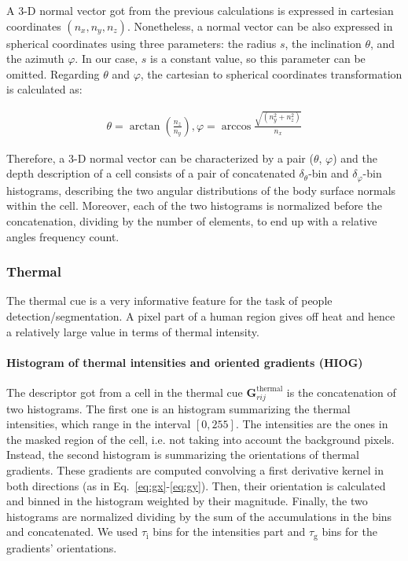 \documentclass[10pt,twocolumn,letterpaper]{article}
\begin{document}
A 3-D normal vector got from the previous calculations is expressed in cartesian coordinates $(n_x, n_y, n_z)$. Nonetheless, a normal vector can be also expressed in spherical coordinates using three parameters: the radius $s$, the inclination $\theta$, and the azimuth $\varphi$. In our case, $s$ is a constant value, so this parameter can be omitted. Regarding $\theta$ and $\varphi$, the cartesian to spherical coordinates transformation is calculated as:

\begin{gather}	
	\theta  = \arctan{\left( \frac{n_z}{n_y} \right)},
	\varphi = \arccos{\frac{ \sqrt{(n_y^2 + n_z^2)} }{n_x}}
\end{gather}

Therefore, a 3-D normal vector can be characterized by a pair ($\theta$, $\varphi$) and the depth description of a cell consists of a pair of concatenated $\delta_\theta$-bin and $\delta_\varphi$-bin histograms, describing the two angular distributions of the body surface normals within the cell. Moreover, each of the two histograms is normalized before the concatenation, dividing by the number of elements, to end up with a relative angles frequency count.

\subsubsection{Thermal}
\label{sssec:thermal}

The thermal cue is a very informative feature for the task of people detection/segmentation. A pixel part of a human region gives off heat and hence a relatively large value in terms of thermal intensity.

\paragraph{Histogram of thermal intensities and oriented gradients (HIOG)} 
The descriptor got from a cell in the thermal cue $\mathbf{G}_{rij}^{\mathrm{thermal}}$ is the concatenation of two histograms. The first one is an histogram summarizing the thermal intensities, which range in the interval $[0, 255]$. The intensities are the ones in the masked region of the cell, i.e. not taking into account the background pixels. Instead, the second histogram is summarizing the orientations of thermal gradients. These gradients are computed convolving a first derivative kernel in both directions (as in Eq.~\ref{eq:gx}-\ref{eq:gy}). Then, their orientation is calculated and binned in the histogram weighted by their magnitude. Finally, the two histograms are normalized dividing by the sum of the accumulations in the bins and concatenated. We used $\tau_{\mathrm{i}}$ bins for the intensities part and $\tau_{\mathrm{g}}$ bins for the gradients' orientations.
\end{document}
